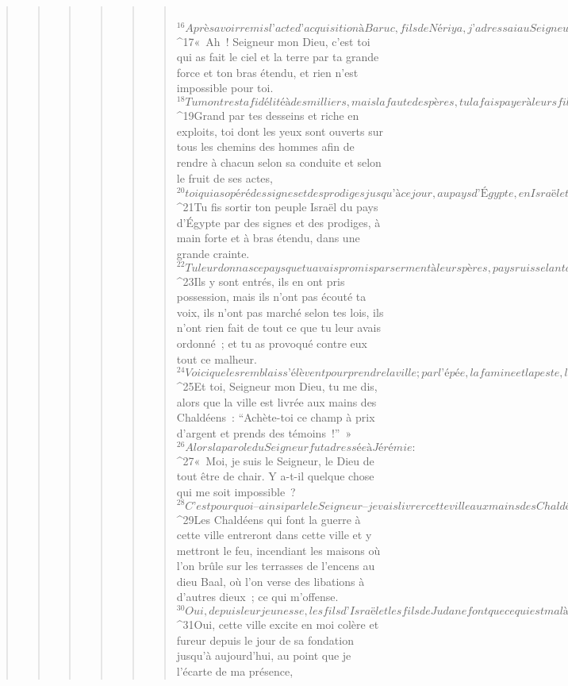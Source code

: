 \begin{verse}
\begin{verse}
\begin{verse}
\begin{verse}
\begin{verse}
\begin{verse}
       
${}^{16}Après avoir remis l’acte d’acquisition à Baruc, fils de Nériya, j’adressai au Seigneur cette prière : 
${}^{17}« Ah ! Seigneur mon Dieu, c’est toi qui as fait le ciel et la terre par ta grande force et ton bras étendu, et rien n’est impossible pour toi. 
${}^{18}Tu montres ta fidélité à des milliers, mais la faute des pères, tu la fais payer à leurs fils après eux. Le Dieu grand, le valeureux, son nom est “Le Seigneur de l’univers”. 
${}^{19}Grand par tes desseins et riche en exploits, toi dont les yeux sont ouverts sur tous les chemins des hommes afin de rendre à chacun selon sa conduite et selon le fruit de ses actes, 
${}^{20}toi qui as opéré des signes et des prodiges jusqu’à ce jour, au pays d’Égypte, en Israël et dans l’humanité, tu t’es fait le nom que tu portes en ce jour. 
${}^{21}Tu fis sortir ton peuple Israël du pays d’Égypte par des signes et des prodiges, à main forte et à bras étendu, dans une grande crainte. 
${}^{22}Tu leur donnas ce pays que tu avais promis par serment à leurs pères, pays ruisselant de lait et de miel. 
${}^{23}Ils y sont entrés, ils en ont pris possession, mais ils n’ont pas écouté ta voix, ils n’ont pas marché selon tes lois, ils n’ont rien fait de tout ce que tu leur avais ordonné ; et tu as provoqué contre eux tout ce malheur. 
${}^{24}Voici que les remblais s’élèvent pour prendre la ville ; par l’épée, la famine et la peste, la ville est livrée aux mains des Chaldéens qui lui font la guerre. Ce que tu as dit se réalise : toi-même, tu le vois. 
${}^{25}Et toi, Seigneur mon Dieu, tu me dis, alors que la ville est livrée aux mains des Chaldéens : “Achète-toi ce champ à prix d’argent et prends des témoins !” »
       
${}^{26}Alors la parole du Seigneur fut adressée à Jérémie : 
${}^{27}« Moi, je suis le Seigneur, le Dieu de tout être de chair. Y a-t-il quelque chose qui me soit impossible ? 
${}^{28}C’est pourquoi – ainsi parle le Seigneur – je vais livrer cette ville aux mains des Chaldéens, aux mains de Nabucodonosor, roi de Babylone, et il la prendra. 
${}^{29}Les Chaldéens qui font la guerre à cette ville entreront dans cette ville et y mettront le feu, incendiant les maisons où l’on brûle sur les terrasses de l’encens au dieu Baal, où l’on verse des libations à d’autres dieux ; ce qui m’offense. 
${}^{30}Oui, depuis leur jeunesse, les fils d’Israël et les fils de Juda ne font que ce qui est mal à mes yeux ; les fils d’Israël ne font que m’offenser par les œuvres de leurs mains – oracle du Seigneur. 
${}^{31}Oui, cette ville excite en moi colère et fureur depuis le jour de sa fondation jusqu’à aujourd’hui, au point que je l’écarte de ma présence, 

\end{verse}
\end{verse}
\end{verse}
\end{verse}
\end{verse}
\end{verse}
